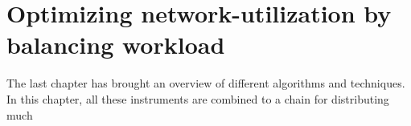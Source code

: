 \chapter{Optimizing network-utilization by balancing workload}
\label{chap:balancing}

The last chapter has brought an overview of different algorithms and techniques.
In this chapter, all these instruments are combined to a chain for distributing much



